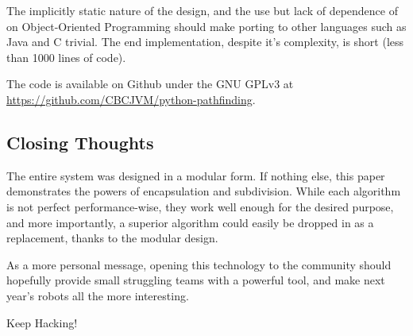 \documentclass[letterpaper, 12pt]{article}
\begin{document}
\begin{multicols}{2}
The implicitly static nature of the design, and the use but lack of dependence
of on Object-Oriented Programming should make porting to other languages such as
Java and C trivial. The end implementation, despite it's complexity, is short
(less than 1000 lines of code).

The code is available on Github under the GNU GPLv3 at
\url{https://github.com/CBCJVM/python-pathfinding}.

\subsection{Closing Thoughts}

The entire system was designed in a modular form. If nothing else, this paper
demonstrates the powers of encapsulation and subdivision. While each algorithm
is not perfect performance-wise, they work well enough for the desired purpose,
and more importantly, a superior algorithm could easily be dropped in as a
replacement, thanks to the modular design.

As a more personal message, opening this technology to the community should
hopefully provide small struggling teams with a powerful tool, and make next
year's robots all the more interesting.

Keep Hacking!

\end{multicols}
\end{document}
